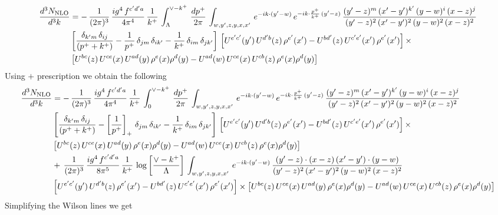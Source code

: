 \documentclass[9pt]{article}
\numberwithin{equation}{section}
\begin{document}
\begin{align}
     \frac{d^{3}N_{\rm NLO}}{d^{3}k} & = -\,\frac{1}{(2\pi)^{3}}\, \frac{ig^{4}\,f^{c'd'a}}{4\pi^{4}}\, \frac{1}{k^{+}}\,\int_{\Lambda}^{\vee-k^{+}}\, \frac{dp^{+}}{2\pi}\, \int_{w,y',z,y,x,x'}\, e^{-ik\cdot (y'-w)}\, e^{-ik\cdot \frac{p^{+}}{k^{+}}\,(y'-z)}\,\frac{(y'-z)^{m}\,(x'-y')^{k'}\,(y-w)^{i}\,(x-z)^{j}}{(y'-z)^{2}\,(x'-y')^{2}\,(y-w)^{2}\,(x-z)^{2}}\notag \\ & \left[\frac{\delta_{k'm}\,\delta_{ij}}{(p^{+}+k^{+})}-\frac{1}{p^{+}}\,\delta_{jm}\,\delta_{ik'}-\frac{1}{k^{+}}\, \delta_{im}\, \delta_{jk'}\right]\, \left[U^{e'c'}(y')\,U^{d'b}(z)\,\rho^{e'}(x')-U^{bd'}(z)\,U^{c'e'}(x')\,\rho^{e'}(x')\right]\times\notag \\ &  \left[U^{bc}(z)\,U^{ce}(x)\,U^{ad}(y)\,\rho^{e}(x)\rho^{d}(y)-U^{ad}(w)\,U^{ce}(x)\,U^{cb}(z)\,\rho^{e}(x)\rho^{d}(y)\right]
\end{align}
Using $+$ prescription we obtain the following
\begin{align}
    \frac{d^{3}N_{\rm NLO}}{d^{3}k} & = -\,\frac{1}{(2\pi)^{3}}\, \frac{ig^{4}\,f^{c'd'a}}{4\pi^{4}}\, \frac{1}{k^{+}}\,\int_{0}^{\vee-k^{+}}\, \frac{dp^{+}}{2\pi}\, \int_{w,y',z,y,x,x'}\, e^{-ik\cdot (y'-w)}\, e^{-ik\cdot \frac{p^{+}}{k^{+}}\,(y'-z)}\,\frac{(y'-z)^{m}\,(x'-y')^{k'}\,(y-w)^{i}\,(x-z)^{j}}{(y'-z)^{2}\,(x'-y')^{2}\,(y-w)^{2}\,(x-z)^{2}}\notag \\ & \left[\frac{\delta_{k'm}\,\delta_{ij}}{(p^{+}+k^{+})}-\left[\frac{1}{p^{+}}\right]_{+}\,\delta_{jm}\,\delta_{ik'}-\frac{1}{k^{+}}\, \delta_{im}\, \delta_{jk'}\right]\, \left[U^{e'c'}(y')\,U^{d'b}(z)\,\rho^{e'}(x')-U^{bd'}(z)\,U^{c'e'}(x')\,\rho^{e'}(x')\right]\times\notag \\ &  \left[U^{bc}(z)\,U^{ce}(x)\,U^{ad}(y)\,\rho^{e}(x)\rho^{d}(y)-U^{ad}(w)\,U^{ce}(x)\,U^{cb}(z)\,\rho^{e}(x)\rho^{d}(y)\right]\notag \\ & +\,\frac{1}{(2\pi)^{3}}\, \frac{ig^{4}\,f^{c'd'a}}{8\pi^{5}}\, \frac{1}{k^{+}}\,\log{\left[\frac{\vee - k^{+}}{\Lambda}\right]}\, \int_{w,y',z,y,x,x'}\, e^{-ik\cdot (y'-w)}\,\frac{(y'-z)\cdot (x-z)\,(x'-y')\cdot (y-w)}{(y'-z)^{2}\,(x'-y')^{2}\,(y-w)^{2}\,(x-z)^{2}}\notag \\ & \left[U^{e'c'}(y')\,U^{d'b}(z)\,\rho^{e'}(x')-U^{bd'}(z)\,U^{c'e'}(x')\,\rho^{e'}(x')\right]\times  \left[U^{bc}(z)\,U^{ce}(x)\,U^{ad}(y)\,\rho^{e}(x)\rho^{d}(y)-U^{ad}(w)\,U^{ce}(x)\,U^{cb}(z)\,\rho^{e}(x)\rho^{d}(y)\right]
\end{align}
Simplifying the Wilson lines we get 
\end{document}
